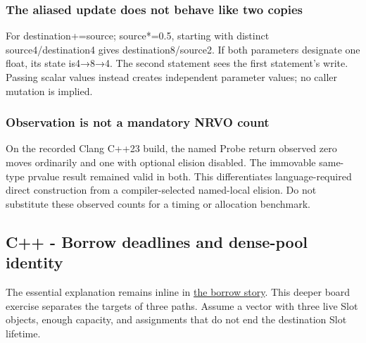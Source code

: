 \subsubsection{The aliased update does not behave like two copies}\label{appendix-92ff77d4dfdc-the-aliased-update-does-not-behave-like-two-copies}

For destination+=source; source*=0.5, starting with distinct source4/destination4 gives destination8/source2. If both parameters designate one float, its state is4→8→4. The second statement sees the first statement's write. Passing scalar values instead creates independent parameter values; no caller mutation is implied.

\subsubsection{Observation is not a mandatory NRVO count}\label{appendix-92ff77d4dfdc-observation-is-not-a-mandatory-nrvo-count}

On the recorded Clang C++23 build, the named Probe return observed zero moves ordinarily and one with optional elision disabled. The immovable same-type prvalue result remained valid in both. This differentiates language-required direct construction from a compiler-selected named-local elision. Do not substitute these observed counts for a timing or allocation benchmark.

\subsection{C++ - Borrow deadlines and dense-pool identity}\label{appendix-92ff77d4dfdc-c---borrow-deadlines-and-dense-pool-identity}

The essential explanation remains inline in \hyperref[01-foundations-i-ch003-when-a-valid-borrow-stops-naming-the-intended-thing]{the borrow story}. This deeper board exercise separates the targets of three paths. Assume a vector with three live Slot objects, enough capacity, and assignments that do not end the destination Slot lifetime.

